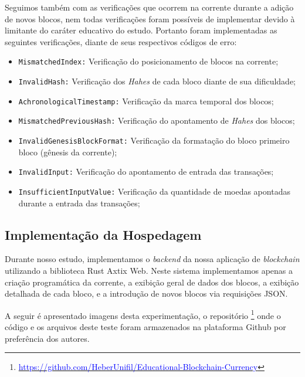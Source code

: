 \documentclass[article,12pt,oneside,a4paper,english,brazil]{unifil}
\begin{document}
\begin{Spacing}{1.5}
Seguimos também com as verificações que ocorrem na corrente durante a adição de novos blocos, nem todas verificações foram possíveis de implementar devido à limitante do caráter educativo do estudo. Portanto foram implementadas as seguintes verificações, diante de seus respectivos códigos de erro:

\begin{itemize}
    \item \texttt{MismatchedIndex:} Verificação do posicionamento de blocos na corrente;
    \item \texttt{InvalidHash:} Verificação dos \textit{Hahes} de cada bloco diante de sua dificuldade;
    \item \texttt{AchronologicalTimestamp:} Verificação da marca temporal dos blocos;
    \item \texttt{MismatchedPreviousHash:} Verificação do apontamento de \textit{Hahes} dos blocos;
    \item \texttt{InvalidGenesisBlockFormat:} Verificação da formatação do bloco primeiro bloco (gênesis da corrente);
    \item \texttt{InvalidInput:} Verificação do apontamento de entrada das transações;
    \item \texttt{InsufficientInputValue:} Verificação da quantidade de moedas apontadas durante a entrada das transações;

\end{itemize}

\subsection*{Implementação da Hospedagem}

Durante nosso estudo, implementamos o \textit{backend} da nossa aplicação de \textit{blockchain} utilizando a biblioteca Rust Axtix Web. Neste sistema implementamos apenas a criação programática da corrente, a exibição geral de dados dos blocos, a exibição detalhada de cada bloco, e a introdução de novos blocos via requisições JSON.

A seguir é apresentado imagens desta experimentação, o repositório \footnote{\href{https://github.com/HeberUnifil/Educational-Blockchain-Currency}{\textcolor{blue}{https://github.com/HeberUnifil/Educational-Blockchain-Currency}}} onde o código e os arquivos deste teste foram armazenados na plataforma Github por preferência dos autores.


\end{Spacing}
\end{document}
